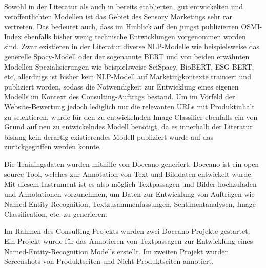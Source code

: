 Sowohl in der Literatur als auch in bereits etablierten, gut entwickelten und veröffentlichten Modellen ist das Gebiet
des Sensory Marketings sehr rar vertreten.
Das bedeutet auch, dass im Hinblick auf den jüngst publizierten \ac{OSMI}-Index ebenfalls bisher wenig technische Entwicklungen
vorgenommen worden sind.
Zwar existieren in der Literatur diverse NLP-Modelle wie beispielsweise das generelle Spacy-Modell oder der sogenannte BERT
und von beiden erwähnten Modellen Spezialisierungen wie beispielsweise SciSpacy, BioBERT, ESG-BERT, etc\., allerdings ist
bisher kein NLP-Modell auf Marketingkontexte trainiert und publiziert worden, sodass die Notwendigkeit zur Entwicklung eines
eigenen Modells im Kontext des Consulting-Auftrags bestand.
Um im Vorfeld der Website-Bewertung jedoch lediglich nur die relevanten URLs mit Produktinhalt zu selektieren, wurde für den zu
entwickelnden Image Classifier ebenfalls ein von Grund auf neu zu entwickelndes Modell benötigt, da es innerhalb der Literatur
bislang kein derartig existierendes Modell publiziert wurde auf das zurückgegriffen werden konnte.

Die Trainingsdaten wurden mithilfe von Doccano generiert.
Doccano ist ein open source Tool, welches zur Annotation von Text und Bilddaten entwickelt wurde.
Mit diesem Instrument ist es also möglich Textpassagen und Bilder hochzuladen und Annotationen vorzunehmen, um Daten zur
Entwicklung von Aufträgen wie Named-Entity-Recognition, Textzusammenfassungen, Sentimentanalysen, Image Classification, etc.
zu generieren.

Im Rahmen des Consulting-Projekts wurden zwei Doccano-Projekte gestartet.
Ein Projekt wurde für das Annotieren von Textpassagen zur Entwicklung eines Named-Entity-Recognition Modells erstellt.
Im zweiten Projekt wurden Screenshots von Produktseiten und Nicht-Produktseiten annotiert.

